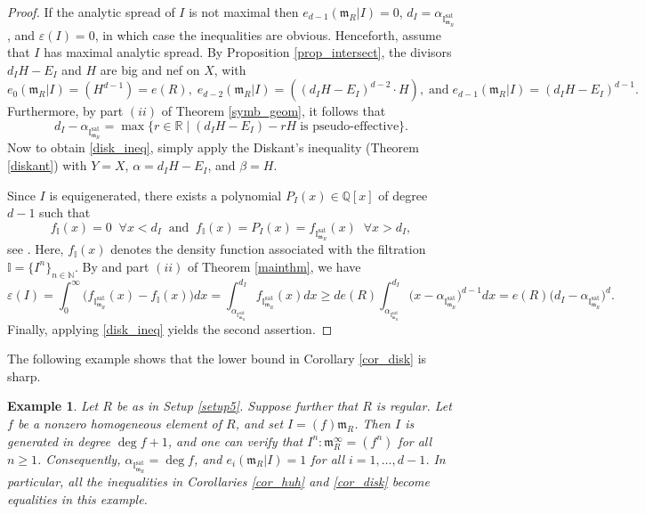 \documentclass[12pt,a4paper]{amsart}
\theoremstyle{plain}
\newtheorem{example}[theorem]{Example}
\theoremstyle{definition}
\numberwithin{equation}{theorem}
\begin{document}
\begin{proof}
If the analytic spread of $I$ is not maximal then $e_{d-1}(\mathfrak{m}_R \vert I)=0$, $d_I= \alpha_{\mathbb{I}^{\mathrm{sat}}_{\mathfrak{m}_R}}$, and $\varepsilon(I)=0$, in which case the inequalities are obvious. Henceforth, assume that $I$ has maximal analytic spread. By Proposition \ref{prop_intersect}, the divisors $d_IH-E_I$ and $H$ are big and nef on $X$, with $$e_0(\mathfrak{m}_R\vert I) = (H^{d-1}) = e(R),\; e_{d-2}\left(\mathfrak{m}_R \vert I\right) = \left((d_IH-E_I)^{d-2}\cdot H\right),\; \text{and}\; e_{d-1}\left(\mathfrak{m}_R \vert I\right) = \left(d_IH-E_I\right)^{d-1}.$$ Furthermore, by part $(ii)$ of Theorem \ref{symb_geom}, it follows that $$d_I-\alpha_{\mathbb{I}^{\mathrm{sat}}_{\mathfrak{m}_R}} = \max\{r\in\mathbb{R}\mid (d_IH-E_I) - rH\;\text{is pseudo-effective}\}.$$  Now to obtain \eqref{disk_ineq}, simply apply the Diskant's inequality (Theorem \ref{diskant}) with $Y=X$, $\alpha = d_IH-E_I$, and $\beta = H$.

Since $I$ is equigenerated, there exists a polynomial $P_I(x) \in \mathbb{Q}[x]$ of degree $d-1$ such that
$$f_{\mathbb{I}}(x) = 0\;\;\forall x<d_I\;\;\text{and}\;\; f_{\mathbb{I}}(x) = P_I(x) = f_{\mathbb{I}^{\mathrm{sat}}_{\mathfrak{m}_R}}(x)\;\; \forall x>d_I,$$ see \cite[Theorems 4.4 and 5.19]{DRT25}. Here, $f_{\mathbb{I}}(x)$ denotes the density function associated with the filtration $\mathbb{I} = \{I^n\}_{n\in\mathbb{N}}$. By \cite[Theorem 5.19]{DRT25} and part $(ii)$ of Theorem \ref{mainthm}, we have $$\varepsilon(I) = \int_{0}^{\infty} \big(f_{\mathbb{I}^{\mathrm{sat}}_{\mathfrak{m}_R}}(x) - f_{\mathbb{I}}(x)\big)dx = \int_{\alpha_{\mathbb{I}^{\mathrm{sat}}_{\mathfrak{m}_R}}}^{d_I} f_{\mathbb{I}^{\mathrm{sat}}_{\mathfrak{m}_R}}(x)dx \geq de(R) \int_{\alpha_{\mathbb{I}^{\mathrm{sat}}_{\mathfrak{m}_R}}}^{d_I} {\big(x-\alpha_{\mathbb{I}^{\mathrm{sat}}_{\mathfrak{m}_R}}\big)}^{d-1}dx = e(R){\big(d_I-\alpha_{\mathbb{I}^{\mathrm{sat}}_{\mathfrak{m}_R}}\big)}^{d}.$$ Finally, applying \eqref{disk_ineq} yields the second assertion.
\end{proof}

The following example shows that the lower bound in Corollary \ref{cor_disk} is sharp.

\begin{example}
Let $R$ be as in Setup \ref{setup5}. Suppose further that $R$ is regular. Let $f$ be a nonzero homogeneous element of $R$, and set $I=(f)\mathfrak{m}_R$. Then $I$ is generated in degree $\deg f+1$, and one can verify that $I^n:\mathfrak{m}_R^\infty=(f^n)$ for all $n\geq 1$. Consequently, $\alpha_{\mathbb{I}^{\mathrm{sat}}_{\mathfrak{m}_R}}=\deg f$, and $e_i(\mathfrak{m}_R\vert I)=1$ for all $i=1,\ldots,d-1$. In particular, all the inequalities in Corollaries \ref{cor_huh} and \ref{cor_disk} become equalities in this example.
\end{example}
\end{document}
